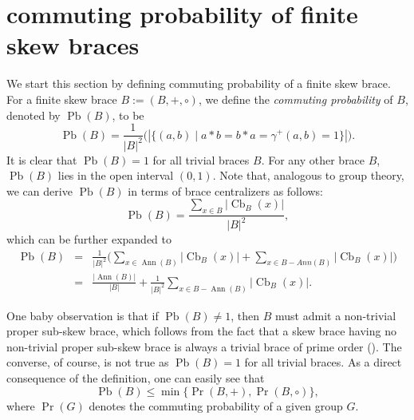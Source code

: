 \documentclass[oneside]{amsart}
\numberwithin{equation}{section}
\theoremstyle{plain}
\theoremstyle{definition}
\newcommand{\Cb}{\operatorname{Cb} }
\newcommand{\Pb}{\operatorname{Pb} }
\renewcommand{\Pr}{\operatorname{Pr} }
\newcommand{\Ann}{\operatorname{Ann} }
\begin{document}
  
  
  

\section{commuting probability of finite skew braces}


We start this section by defining  commuting probability of a finite skew  brace. For  a finite skew  brace  $B:= (B, +, \circ)$, we define the  \emph{commuting probability} of $B$, denoted by $\Pb(B)$, to be 
$$\Pb(B)  =  \frac{1}{ |B|^{2}} \big(|\{(a, b) \mid a * b = b* a = \gamma^+(a, b) = 1\}|\big).$$
It is clear that $\Pb(B) = 1$ for all  trivial braces $B$. For any other brace $B$,  $\Pb(B)$ lies in the open interval $(0, 1)$.
 Note that, analogous to group theory, we can derive $\Pb(B)$ in terms of brace centralizers as follows:
$$\Pb(B) = \frac{\sum_{x\in B}|\Cb_{B}(x)|}{|B|^2},$$
which can be further expanded to
\begin{eqnarray}\label{exp-Pb}
\Pb(B) &=& \frac{1}{|B|^2} \Big(\sum_{x\in \Ann(B)}|\Cb_{B}(x)|+\sum_{x\in B-Ann(B)}|\Cb_{B}(x)|\Big) \nonumber \\
&=& \frac{|\Ann(B)|}{|B|} + \frac{1}{|B|^2} \sum_{x\in B-\Ann(B)}|\Cb_{B}(x)|.
\end{eqnarray}

One baby observation is that if  $\Pb(B)  \ne  1$, then $B$ must admit a non-trivial proper sub-skew brace, which follows from the fact that a skew brace having no  non-trivial proper sub-skew brace is always a trivial brace of prime  order (\cite[Theorem A]{BEJP24}). The converse, of course, is not true as $\Pb(B) = 1$ for all trivial  braces. As a direct consequence of the definition, one can easily see that
$$\Pb(B) \leqslant \min\{\Pr(B, +), \Pr(B, \circ)\},$$
where $\Pr(G)$ denotes the commuting probability of a given group $G$.
\end{document}
